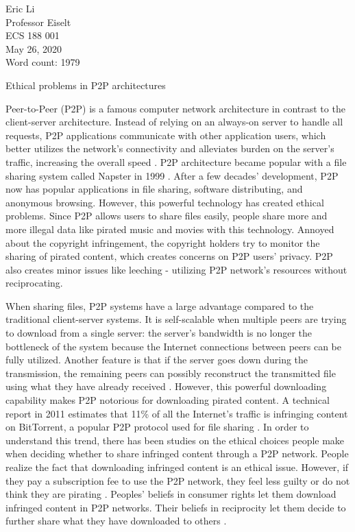 \documentclass[12pt]{article}
\begin{document}
\raggedright

Eric Li \\ Professor Eiselt \\ ECS 188 001 \\ May 26, 2020 \\ Word count: 1979
\setlength{\parindent}{.5in}
\centerline{Ethical problems in P2P architectures}

Peer-to-Peer (P2P) is a famous computer network architecture in contrast to the client-server architecture. Instead of relying on an always-on server to handle all requests, P2P applications communicate with other application users, which better utilizes the network's connectivity and alleviates burden on the server's traffic, increasing the overall speed \cite{01_KuroseJamesF2013Cn:a}. P2P architecture became popular with a file sharing system called Napster in 1999 \cite{60_napster}. After a few decades' development, P2P now has popular applications in file sharing, software distributing, and anonymous browsing. However, this powerful technology has created ethical problems. Since P2P allows users to share files easily, people share more and more illegal data like pirated music and movies with this technology. Annoyed about the copyright infringement, the copyright holders try to monitor the sharing of pirated content, which creates concerns on P2P users' privacy. P2P also creates minor issues like leeching - utilizing P2P network's resources without reciprocating.

When sharing files, P2P systems have a large advantage compared to the traditional client-server systems. It is self-scalable when multiple peers are trying to download from a single server: the server's bandwidth is no longer the bottleneck of the system because the Internet connections between peers can be fully utilized. Another feature is that if the server goes down during the transmission, the remaining peers can possibly reconstruct the transmitted file using what they have already received \cite{01_KuroseJamesF2013Cn:a}. However, this powerful downloading capability makes P2P notorious for downloading pirated content. A technical report in 2011 estimates that 11\% of all the Internet's traffic is infringing content on BitTorrent, a popular P2P protocol used for file sharing \cite{53_house2011technical}. In order to understand this trend, there has been studies on the ethical choices people make when deciding whether to share infringed content through a P2P network. People realize the fact that downloading infringed content is an ethical issue. However, if they pay a subscription fee to use the P2P network, they feel less guilty or do not think they are pirating \cite{18_article}. Peoples' beliefs in consumer rights let them download infringed content in P2P networks. Their beliefs in reciprocity let them decide to further share what they have downloaded to others \cite{17_article}. 
\end{document}
